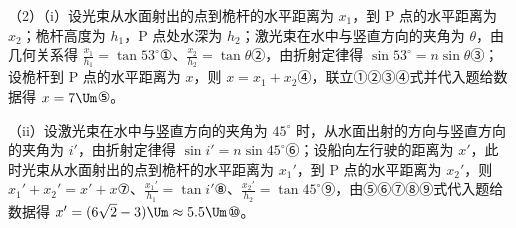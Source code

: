 \documentclass[\gkver]{gaokaozhenti}
\begin{document}
\begin{enumerate}
{（2）（i）设光束从水面射出的点到桅杆的水平距离为 $x_1$，到 P 点的水平距离为 $x_2$；桅杆高度为 $h_1$，P 点处水深为 $h_2$；激光束在水中与竖直方向的夹角为 $\theta$，由几何关系得 $\frac{x_1}{h_1}=\tan53^{\circ}$①、$\frac{x_2}{h_2}=\tan\theta$②，由折射定律得 $\sin53^{\circ}=n\sin\theta$③；设桅杆到 P 点的水平距离为 $x$，则 $x=x_1+x_2$④，联立①②③④式并代入题给数据得 $x=7\Um$⑤。

（ii）设激光束在水中与竖直方向的夹角为 $45^{\circ}$ 时，从水面出射的方向与竖直方向的夹角为 $i'$，由折射定律得 $\sin i'=n\sin45^{\circ}$⑥；设船向左行驶的距离为 $x'$，此时光束从水面射出的点到桅杆的水平距离为 $x_1'$，到 P 点的水平距离为 $x_2'$，则 $x_1'+x_2'=x'+x$⑦、$\frac{x_1'}{h_1}=\tan i'$⑧、$\frac{x_2'}{h_2}=\tan45^{\circ}$⑨，由⑤⑥⑦⑧⑨式代入题给数据得 $x'=(6\sqrt{2}-3)\Um\approx5.5\Um$⑩。
}

\end{enumerate}
\end{document}
